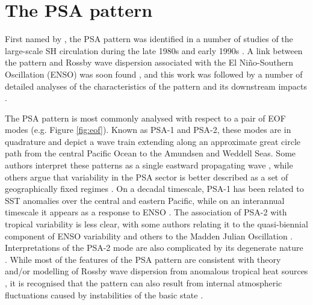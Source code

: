 
\section{The PSA pattern}\label{s:psa_overview}

First named by \citet{Mo1987}, the PSA pattern was identified in a number of studies of the large-scale SH circulation during the late 1980s and early 1990s \citep[e.g.][]{Kidson1988,Ghil1991,Lau1994}. A link between the pattern and Rossby wave dispersion associated with the El Ni\~{n}o-Southern Oscillation (ENSO) was soon found \citep[e.g.][]{Karoly1989}, and this work was followed by a number of detailed analyses of the characteristics of the pattern and its downstream impacts \citep[e.g.][]{Mo1998,Mo2000,Mo2001}.

The PSA pattern is most commonly analysed with respect to a pair of EOF modes (e.g. Figure \ref{fig:eof}). Known as PSA-1 and PSA-2, these modes are in quadrature and depict a wave train extending along an approximate great circle path from the central Pacific Ocean to the Amundsen and Weddell Seas. Some authors interpret these patterns as a single eastward propagating wave \citep{Mo1998}, while others argue that variability in the PSA sector is better described as a set of geographically fixed regimes \citep{Robertson2003}. On a decadal timescale, PSA-1 has been related to SST anomalies over the central and eastern Pacific, while on an interannual timescale it appears as a response to ENSO \citep{Mo2001}. The association of PSA-2 with tropical variability is less clear, with some authors relating it to the quasi-biennial component of ENSO variability \citep{Mo2000} and others to the Madden Julian Oscillation \citep{Renwick1999}. Interpretations of the PSA-2 mode are also complicated by its degenerate \citep{North1982} nature \citep[e.g. Figure 1;][]{Mo2000}. While most of the features of the PSA pattern are consistent with theory and/or modelling of Rossby wave dispersion from anomalous tropical heat sources \citep[e.g.][]{Liu2007,Li2015}, it is recognised that the pattern can also result from internal atmospheric fluctuations caused by instabilities of the basic state \citep[and that both mechanisms likely act in concert; e.g.][]{Grimm2009}.

